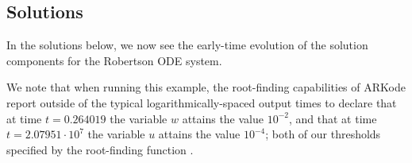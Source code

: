\documentclass[letterpaper,10pt,english]{sphinxmanual}
\begin{document}
\subsection{Solutions}
\label{c_serial:id15}
In the solutions below, we now see the early-time evolution of the
solution components for the Robertson ODE system.
\begin{figure}[htbp]
\centering

\end{figure}

We note that when running this example, the root-finding capabilities
of ARKode report outside of the typical logarithmically-spaced output
times to declare that at time $t=0.264019$ the variable
$w$ attains the value $10^{-2}$, and that at time
$t=2.07951\cdot10^{7}$ the variable $u$ attains the value
$10^{-4}$; both of our thresholds specified by the root-finding
function .
\end{document}
